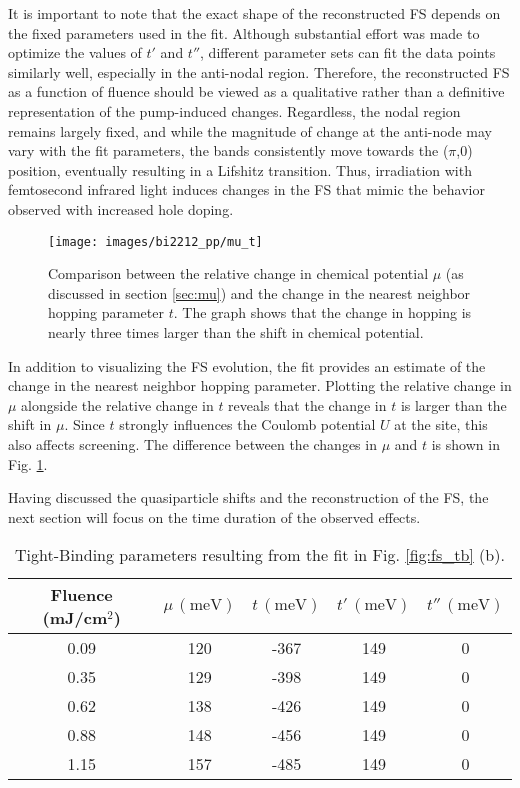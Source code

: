 It is important to note that the exact shape of the reconstructed FS depends on the fixed parameters used in the fit.
Although substantial effort was made to optimize the values of $t'$ and $t''$, different parameter sets can fit the data points similarly well, especially in the anti-nodal region.
Therefore, the reconstructed FS as a function of fluence should be viewed as a qualitative rather than a definitive representation of the pump-induced changes.
Regardless, the nodal region remains largely fixed, and while the magnitude of change at the anti-node may vary with the fit parameters, the bands consistently move towards the ($\pi$,$0$) position, eventually resulting in a Lifshitz transition.
Thus, irradiation with femtosecond infrared light induces changes in the FS that mimic the behavior observed with increased hole doping.

\begin{figure}
	\centering
	\texttt{[image: images/bi2212\_pp/mu\_t]}
	\caption{Comparison between the relative change in chemical potential $\mu$ (as discussed in section \ref{sec:mu}) and the change in the nearest neighbor hopping parameter $t$. The graph shows that the change in hopping is nearly three times larger than the shift in chemical potential.}
	\label{fig:mu_t}
\end{figure}

In addition to visualizing the FS evolution, the fit provides an estimate of the change in the nearest neighbor hopping parameter.
Plotting the relative change in $\mu$ alongside the relative change in $t$ reveals that the change in $t$ is larger than the shift in $\mu$.
Since $t$ strongly influences the Coulomb potential $U$ at the  site, this also affects screening.
The difference between the changes in $\mu$ and $t$ is shown in Fig. \ref{fig:mu_t}.

Having discussed the quasiparticle shifts and the reconstruction of the FS, the next section will focus on the time duration of the observed effects.

\begin{table}[h!]
	\centering
	\begin{tabular}{ccccc}
		\toprule[1pt]\midrule[0.3pt]
		Fluence (mJ/cm\(^2\)) & \(\mu \, (\text{meV})\) & \(t \, (\text{meV})\) & \(t' \, (\text{meV})\) & \(t'' \, (\text{meV})\) \\ 
		\midrule
		0.09 & 120 & -367 & 149 & 0 \\ 
		0.35 & 129 & -398 & 149 & 0 \\ 
		0.62 & 138 & -426 & 149 & 0 \\ 
		0.88 & 148 & -456 & 149 & 0 \\ 
		1.15 & 157 & -485 & 149 & 0 \\ 
		\midrule[0.3pt]\bottomrule[1pt]
	\end{tabular}
	\caption{Tight-Binding parameters resulting from the fit in Fig. \ref{fig:fs_tb} (b).}
\end{table}


